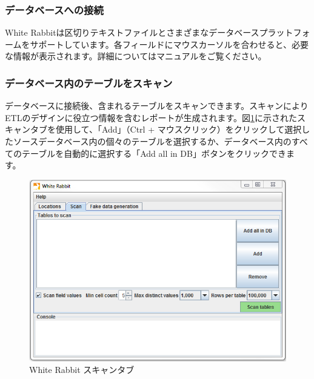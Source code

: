 \documentclass[
  11pt]{book}
\theoremstyle{definition}
\theoremstyle{definition}
\theoremstyle{definition}
\theoremstyle{definition}
\theoremstyle{remark}
\begin{document}
\subsubsection*{データベースへの接続}\label{ux30c7ux30fcux30bfux30d9ux30fcux30b9ux3078ux306eux63a5ux7d9a}

White Rabbitは区切りテキストファイルとさまざまなデータベースプラットフォームをサポートしています。各フィールドにマウスカーソルを合わせると、必要な情報が表示されます。詳細についてはマニュアルをご覧ください。

\subsubsection*{データベース内のテーブルをスキャン}\label{ux30c7ux30fcux30bfux30d9ux30fcux30b9ux5185ux306eux30c6ux30fcux30d6ux30ebux3092ux30b9ux30adux30e3ux30f3}

データベースに接続後、含まれるテーブルをスキャンできます。スキャンによりETLのデザインに役立つ情報を含むレポートが生成されます。図\ref{fig:WhiteRabbitAddTables}に示されたスキャンタブを使用して、「Add」（Ctrl + マウスクリック）をクリックして選択したソースデータベース内の個々のテーブルを選択するか、データベース内のすべてのテーブルを自動的に選択する「Add all in DB」ボタンをクリックできます。

\begin{figure}

{\centering \includegraphics[width=1\linewidth]{images/ExtractTransformLoad/WhiteRabbitAddTables} 

}

\caption{White Rabbit スキャンタブ}\label{fig:WhiteRabbitAddTables}
\end{figure}
\end{document}
